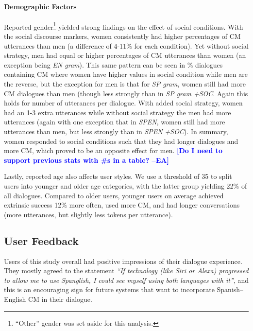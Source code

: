 \documentclass[11pt,a4paper]{article}
\newcommand{\ea}[1]{\textcolor{blue}{\bf\small [#1 --EA]}}
\begin{document}
\paragraph{Demographic Factors}
Reported gender\footnote{``Other'' gender was set aside for this analysis.} yielded strong findings on the effect of social conditions.
With the social discourse markers, women consistently had higher percentages of CM utterances than men (a difference of 4-11\% for each condition).
Yet without social strategy, men had equal or higher percentages of CM utterances than women (an exception being \textit{EN gram}). 
This same pattern can be seen in \% dialogues containing CM where women have higher values in social condition while men are the reverse, but the exception for men is that for \textit{SP gram}, women still had more CM dialogues than men (though less strongly than in \textit{SP gram +SOC}.
Again this holds for number of utterances per dialogue. 
With added social strategy, women had an 1-3 extra utterances while without social strategy the men had more utterances (again with one exception that in \textit{SP\textrightarrow EN}, women still had more utterances than men, but less strongly than in \textit{SP\textrightarrow EN +SOC}).
In summary, women responded to social conditions such that they had longer dialogues and more CM, which proved to be an opposite effect for men.
\ea{Do I need to support previous stats with \#s in a table?}

Lastly, reported age also affects user styles.
We use a threshold of 35 to split users into younger and older age categories, with the latter group yielding 22\% of all dialogues.
Compared to older users, younger users on average achieved extrinsic success 12\% more often, used more CM, and had longer conversations (more utterances, but slightly less tokens per utterance).


\subsection{User Feedback}
Users of this study overall had positive impressions of their dialogue experience.
They mostly agreed to the statement \textit{``If technology (like Siri or Alexa) progressed to allow me to use Spanglish, I could see myself using both languages with it''}, and this is an encouraging sign for future systems that want to incorporate Spanish--English CM in their dialogue.
\end{document}
